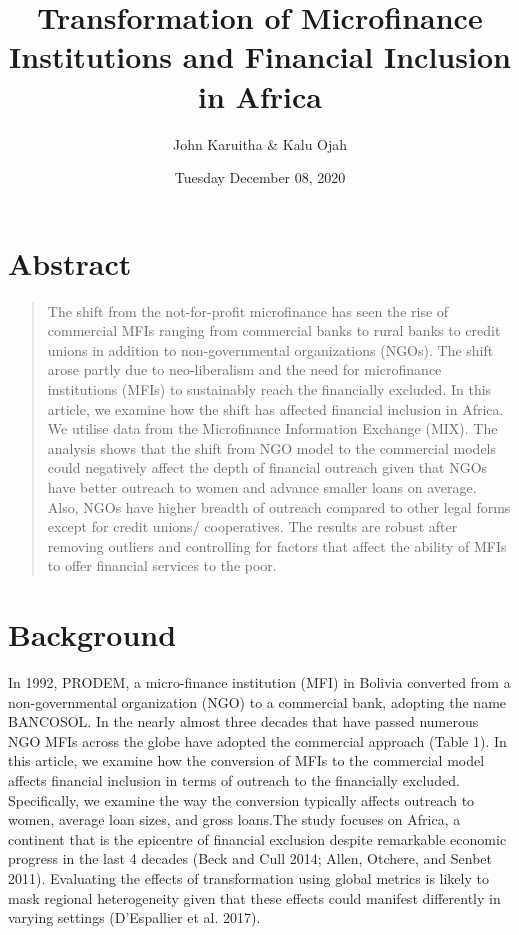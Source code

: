 \documentclass[
]{article}
\title{Transformation of Microfinance Institutions and Financial
Inclusion in Africa}
\author{John Karuitha \& Kalu Ojah}
\date{Tuesday December 08, 2020}
\begin{document}
\maketitle

{
\setcounter{tocdepth}{2}
\tableofcontents
}
\hypertarget{abstract}{%
\section{\texorpdfstring{\textbf{Abstract}}{Abstract}}\label{abstract}}

\begin{quote}
The shift from the not-for-profit microfinance has seen the rise of
commercial MFIs ranging from commercial banks to rural banks to credit
unions in addition to non-governmental organizations (NGOs). The shift
arose partly due to neo-liberalism and the need for microfinance
institutions (MFIs) to sustainably reach the financially excluded. In
this article, we examine how the shift has affected financial inclusion
in Africa. We utilise data from the Microfinance Information Exchange
(MIX). The analysis shows that the shift from NGO model to the
commercial models could negatively affect the depth of financial
outreach given that NGOs have better outreach to women and advance
smaller loans on average. Also, NGOs have higher breadth of outreach
compared to other legal forms except for credit unions/ cooperatives.
The results are robust after removing outliers and controlling for
factors that affect the ability of MFIs to offer financial services to
the poor.
\end{quote}

\hypertarget{background}{%
\section{\texorpdfstring{\textbf{Background}}{Background}}\label{background}}

In 1992, PRODEM, a micro-finance institution (MFI) in Bolivia converted
from a non-governmental organization (NGO) to a commercial bank,
adopting the name BANCOSOL. In the nearly almost three decades that have
passed numerous NGO MFIs across the globe have adopted the commercial
approach (Table 1). In this article, we examine how the conversion of
MFIs to the commercial model affects financial inclusion in terms of
outreach to the financially excluded. Specifically, we examine the way
the conversion typically affects outreach to women, average loan sizes,
and gross loans.The study focuses on Africa, a continent that is the
epicentre of financial exclusion despite remarkable economic progress in
the last 4 decades (Beck and Cull 2014; Allen, Otchere, and Senbet
2011). Evaluating the effects of transformation using global metrics is
likely to mask regional heterogeneity given that these effects could
manifest differently in varying settings (D'Espallier et al. 2017).
\end{document}
